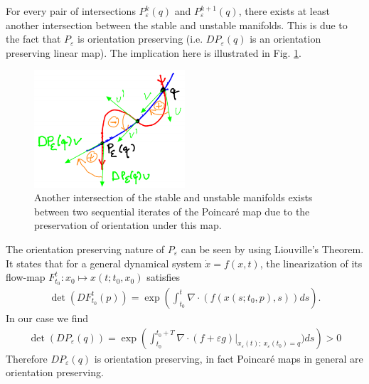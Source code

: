 \begin{remark}[]
	For every pair of intersections $P_{\varepsilon}^{k}(q)$ and $P _{\varepsilon}^{k+1}(q)$, there exists at least another intersection between the stable and unstable manifolds. This is due to the fact that $P_{\varepsilon}$ is orientation preserving (i.e. $DP_{\varepsilon}(q)$ is an orientation preserving linear map). The implication here is illustrated in Fig. \ref{fig:between_intersections}.
\begin{figure}[h!]
	\centering
	\includegraphics[width=0.5\textwidth]{figures/ch6/13between_intersections.png}
	\caption{Another intersection of the stable and unstable manifolds exists between two sequential iterates of the Poincaré map due to the preservation of orientation under this map.}
	\label{fig:between_intersections}
\end{figure}

The orientation preserving nature of $P_{\varepsilon}$ can be seen by using Liouville's Theorem. It states that for a general dynamical system $\dot{x}=f(x,t)$, the linearization of its flow-map $F_{t_0}^t:x_0 \mapsto x(t;t_0, x_0)$ satisfies 
	\begin{align}
		\det(DF_{t_0}^{t}(p)) = \exp \left( \int_{t_0}^{t}  \nabla \cdot ( f(x(s;t_0,p),s))ds\right).
	\end{align}
In our case we find
	\begin{align}
		\det (DP_{\varepsilon}(q)) = \exp\left(\int_{t_0}^{t_0+T} \nabla \cdot \left. (f + \varepsilon g) \right|_{x_{\varepsilon}(t);\ x_{\varepsilon}(t_0)=q}) ds \right) > 0
	\end{align}
	Therefore $DP_{\varepsilon}(q)$ is orientation preserving, in fact Poincaré maps in general are orientation preserving.	
\end{remark}


